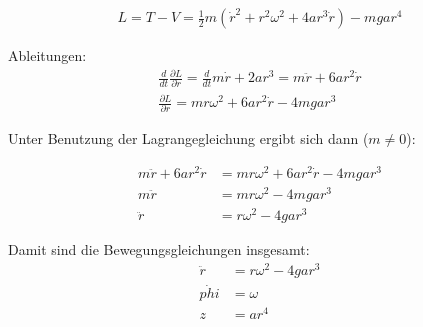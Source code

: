 \documentclass[a4paper,german,12pt,smallheadings]{scrartcl}
\begin{document}
\begin{align*}
  L = T - V = \frac{1}{2}m(\dot{r}^2 + r^2\omega^2 + 4ar^3\dot{r}) - mgar^4
\end{align*}

Ableitungen:
\begin{align*}
  \frac{d}{dt} \frac{\partial L}{\partial \dot{r}} = \frac{d}{dt} m\dot{r} + 2ar^3 = m\ddot{r} + 6ar^2\dot{r} \\
  \frac{\partial L}{\partial r} = mr\omega^2+6ar^2\dot{r} - 4mgar^3
\end{align*}

Unter Benutzung der Lagrangegleichung ergibt sich dann ($m \neq 0$):

\begin{align*}
  m\ddot{r} + 6ar^2\dot{r} &=  mr\omega^2 + 6ar^2\dot{r} - 4mgar^3 \\
  m\ddot{r} &= mr\omega^2 - 4mgar^3 \\
  \ddot{r} &= r\omega^2 - 4gar^3
\end{align*}

Damit sind die Bewegungsgleichungen insgesamt:
\begin{align*}
  \ddot{r} &= r\omega^2 - 4gar^3 \\
  \dot{phi} &= \omega \\
  z &= ar^4
\end{align*}
\end{document}

